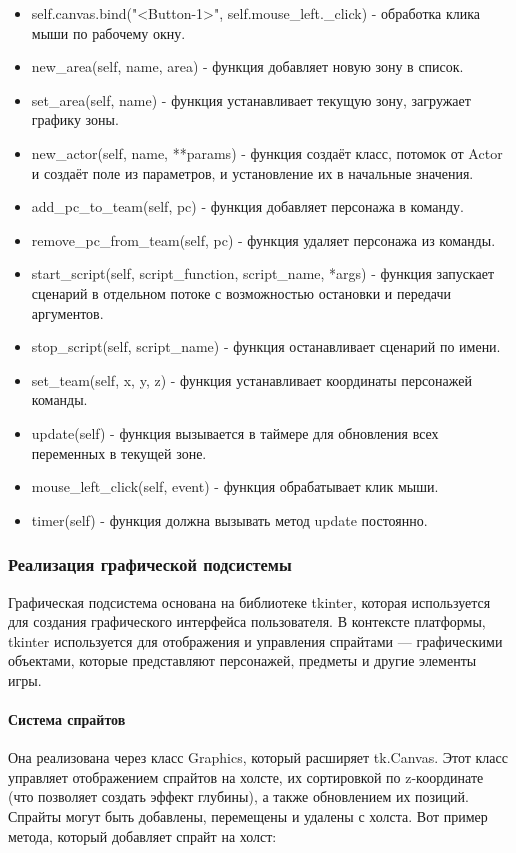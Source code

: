 \begin{enumerate}
\begin{itemize}
		\item self.canvas.bind("<Button-1>", self.mouse\_left.\_click) - обработка клика мыши по рабочему окну.
		\item new\_area(self, name, area) - функция добавляет новую зону в список.
		\item set\_area(self, name) - функция устанавливает текущую зону, загружает графику зоны.
		\item new\_actor(self, name, **params) - функция создаёт класс, потомок от Actor и создаёт поле из параметров, и установление их в начальные значения.
		\item add\_pc\_to\_team(self, pc) - функция добавляет персонажа в команду.
		\item remove\_pc\_from\_team(self, pc) - функция удаляет персонажа из команды.
		\item start\_script(self, script\_function, script\_name, *args) - функция запускает сценарий в отдельном потоке с возможностью остановки и передачи аргументов.
		\item stop\_script(self, script\_name) - функция останавливает сценарий по имени.
		\item set\_team(self, x, y, z) - функция устанавливает координаты персонажей команды.
		\item update(self) - функция вызывается в таймере для обновления всех переменных в текущей зоне.
		\item mouse\_left\_click(self, event) - функция обрабатывает клик мыши.
		\item timer(self) - функция должна вызывать метод update постоянно.
	\end{itemize}
\end{enumerate}

\subsubsection{Реализация графической подсистемы}
Графическая подсистема основана на библиотеке tkinter, которая используется для создания графического интерфейса пользователя. В контексте платформы, tkinter используется для отображения и управления спрайтами — графическими объектами, которые представляют персонажей, предметы и другие элементы игры.
\paragraph{Система спрайтов}
Она реализована через класс Graphics, который расширяет tk.Canvas. Этот класс управляет отображением спрайтов на холсте, их сортировкой по z-координате (что позволяет создать эффект глубины), а также обновлением их позиций. Спрайты могут быть добавлены, перемещены и удалены с холста. Вот пример метода, который добавляет спрайт на холст:

